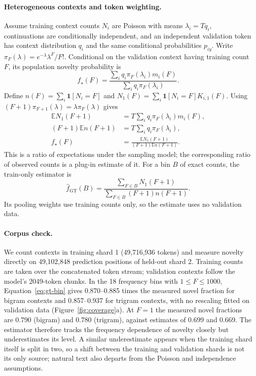 \paragraph{Heterogeneous contexts and token weighting.}
Assume training context counts $N_i$ are Poisson with means $\lambda_i=Tq_i$, continuations are conditionally independent, and an independent validation token has context distribution $q_i$ and the same conditional probabilities $p_{iy}$. Write $\pi_F(\lambda)=e^{-\lambda}\lambda^F/F!$. Conditional on the validation context having training count $F$, its population novelty probability is
\begin{equation}
f_\star(F)=\frac{\sum_i q_i\pi_F(\lambda_i)m_i(F)}{\sum_i q_i\pi_F(\lambda_i)}.
\end{equation}
Define $n(F)=\sum_i\mathbf1[N_i=F]$ and $N_1(F)=\sum_i\mathbf1[N_i=F]K_{i,1}(F)$. Using $(F+1)\pi_{F+1}(\lambda)=\lambda\pi_F(\lambda)$ gives
\begin{equation}
\begin{aligned}
\mathbb E N_1(F+1)&=T\sum_i q_i\pi_F(\lambda_i)m_i(F),\\
(F+1)\mathbb E n(F+1)&=T\sum_i q_i\pi_F(\lambda_i),\\
f_\star(F)&=\frac{\mathbb E N_1(F+1)}{(F+1)\mathbb E n(F+1)}.
\end{aligned}
\label{eq:gt-poisson}
\end{equation}
This is a ratio of expectations under the sampling model; the corresponding ratio of observed counts is a plug-in estimate of it. For a bin $B$ of exact counts, the train-only estimator is
\begin{equation}
\widehat f_{\mathrm{GT}}(B)=\frac{\sum_{F\in B}N_1(F+1)}{\sum_{F\in B}(F+1)n(F+1)}.
\label{eq:gt-bin}
\end{equation}
Its pooling weights use training counts only, so the estimate uses no validation data.

\paragraph{Corpus check.}
We count contexts in training shard 1 (49,716,936 tokens) and measure novelty directly on 49,102,848 prediction positions of held-out shard 2. Training counts are taken over the concatenated token stream; validation contexts follow the model's 2049-token chunks. In the 18 frequency bins with $1\le F\le1000$, Equation~\eqref{eq:gt-bin} gives 0.870--0.885 times the measured novel fraction for bigram contexts and 0.857--0.937 for trigram contexts, with no rescaling fitted on validation data (Figure~\ref{fig:coverage}a). At $F=1$ the measured novel fractions are 0.790 (bigram) and 0.780 (trigram), against estimates of 0.699 and 0.669. The estimator therefore tracks the frequency dependence of novelty closely but underestimates its level. A similar underestimate appears when the training shard itself is split in two, so a shift between the training and validation shards is not its only source; natural text also departs from the Poisson and independence assumptions.

